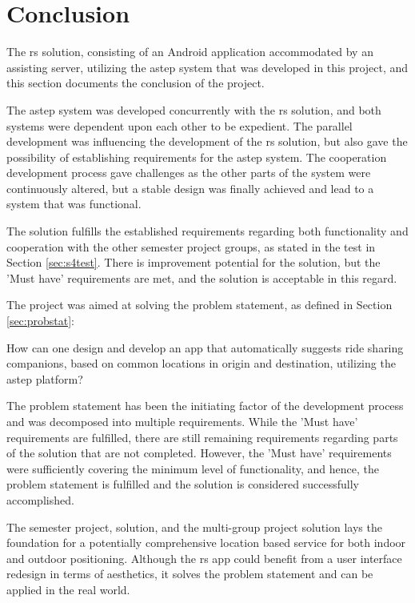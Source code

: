 \section{Conclusion}
The \gls{rs} solution, consisting of an Android application accommodated by an assisting server, utilizing the \gls{astep} system that was developed in this project, and this section documents the conclusion of the project.


The \gls{astep} system was developed concurrently with the \gls{rs} solution, and both systems were dependent upon each other to be expedient.
The parallel development was influencing the development of the \gls{rs} solution, but also gave the possibility of establishing requirements for the \gls{astep} system.
The cooperation development process gave challenges as the other parts of the system were continuously altered, but a stable design was finally achieved and lead to a system that was functional.


The solution fulfills the established requirements regarding both functionality and cooperation with the other semester project groups, as stated in the test in Section \ref{sec:s4test}.
There is improvement potential for the solution, but the 'Must have' requirements are met, and the solution is acceptable in this regard.


The project was aimed at solving the problem statement, as defined in Section \ref{sec:probstat}:

{\addtolength{\leftskip}{10mm}\addtolength{\rightskip}{10mm}\noindent\hrulefill\it
	
	\noindent How can one design and develop an app that automatically suggests ride sharing companions, based on common locations in origin and destination, utilizing the \gls{astep} platform? 
	
	\noindent\hrulefill
	
}

The problem statement has been the initiating factor of the development process and was decomposed into multiple requirements.
While the 'Must have' requirements are fulfilled, there are still remaining requirements regarding parts of the solution that are not completed.
However, the 'Must have' requirements were sufficiently covering the minimum level of functionality, and hence, the problem statement is fulfilled and the solution is considered successfully accomplished.

The semester project, solution, and the multi-group project solution lays the foundation for a potentially comprehensive location based service for both indoor and outdoor positioning.
Although the \gls{rs} app could benefit from a user interface redesign in terms of aesthetics, it solves the problem statement and can be applied in the real world.
